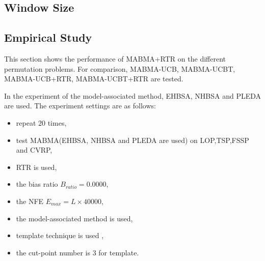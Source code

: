 \subsection{Window Size}
\subsection{Empirical Study}
This section shows the performance of MABMA+RTR on the different permutation problems. For comparison, MABMA-UCB, MABMA-UCBT, MABMA-UCB+RTR, MABMA-UCBT+RTR are tested.

In the experiment of the model-associated method, EHBSA, NHBSA and PLEDA are used.  The experiment settings are as follows:
\begin{itemize}
    \item repeat 20 times,
    \item test MABMA(EHBSA, NHBSA and PLEDA are used) on LOP,TSP,FSSP and CVRP,
    \item RTR is used,
    \item the bias ratio $B_{ratio} = 0.0000$,
    \item the NFE $E_{max} = L \times 40000$,
    \item the model-associated method is used,
    \item template technique is used ,
    \item the cut-point number is 3 for template.
\end{itemize}


